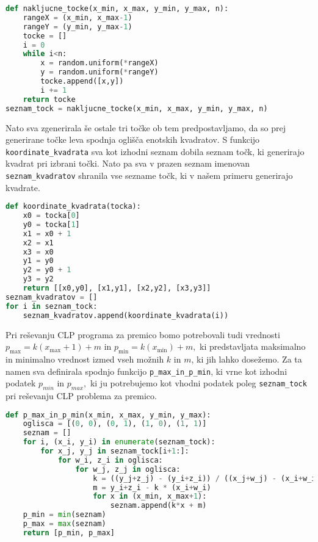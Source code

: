 \documentclass[a4paper]{article}
\begin{document}
\begin{lstlisting}[language=Python]
def nakljucne_tocke(x_min, x_max, y_min, y_max, n):
    rangeX = (x_min, x_max-1)
    rangeY = (y_min, y_max-1)
    tocke = []
    i = 0
    while i<n:
        x = random.uniform(*rangeX) 
        y = random.uniform(*rangeY)
        tocke.append([x,y])
        i += 1
    return tocke
seznam_tock = nakljucne_tocke(x_min, x_max, y_min, y_max, n)
\end{lstlisting}

Nato sva zgenerirala še ostale tri točke ob tem predpostavljamo, da so prej generirane točke leva spodnja oglišča enotskih kvadratov. S funkcijo \texttt{koordinate\_kvadrata} sva kot izhodni seznam dobila seznam točk, ki generirajo kvadrat pri izbrani točki. Nato pa sva v prazen seznam imenovan \texttt{seznam\_kvadratov} shranila vse sezname točk, ki v našem primeru generirajo kvadrate.

\begin{lstlisting}[language=Python]
def koordinate_kvadrata(tocka):
    x0 = tocka[0]
    y0 = tocka[1]
    x1 = x0 + 1
    x2 = x1
    x3 = x0
    y1 = y0
    y2 = y0 + 1
    y3 = y2
    return [[x0,y0], [x1,y1], [x2,y2], [x3,y3]]
seznam_kvadratov = []  
for i in seznam_tock:
    seznam_kvadratov.append(koordinate_kvadrata(i))
\end{lstlisting}

Pri reševanju CLP programa za premico bomo potrebovali tudi vrednosti $p_{\max} = k (x_{\max}+1)+m$ in $p_{\min} = k (x_{\min})+m,$ ki predstavljata maksimalno in minimalno vrednost izmed vseh možnih $k$ in $m$, ki jih lahko dosežemo. Za ta namen sva definirala spodnjo funkcijo \texttt{p\_max\_in\_p\_min}, ki vrne kot izhodni podatek $p_{min}$ in $p_{max},$ ki ju potrebujemo kot vhodni podatek poleg \texttt{seznam\_tock} pri reševanju CLP problema za premico.

\begin{lstlisting}[language=Python]
def p_max_in_p_min(x_min, x_max, y_min, y_max):
    oglisca = [(0, 0), (0, 1), (1, 0), (1, 1)]
    seznam = []
    for i, (x_i, y_i) in enumerate(seznam_tock): 
        for x_j, y_j in seznam_tock[i+1:]: 
            for w_i, z_i in oglisca: 
                for w_j, z_j in oglisca: 
                    k = ((y_j+z_j) - (y_i+z_i)) / ((x_j+w_j) - (x_i+w_i))
                    m = y_i+z_i - k * (x_i+w_i)
                    for x in (x_min, x_max+1): 
                        seznam.append(k*x + m)
    p_min = min(seznam)
    p_max = max(seznam)
    return [p_min, p_max]
\end{lstlisting}
\end{document}
